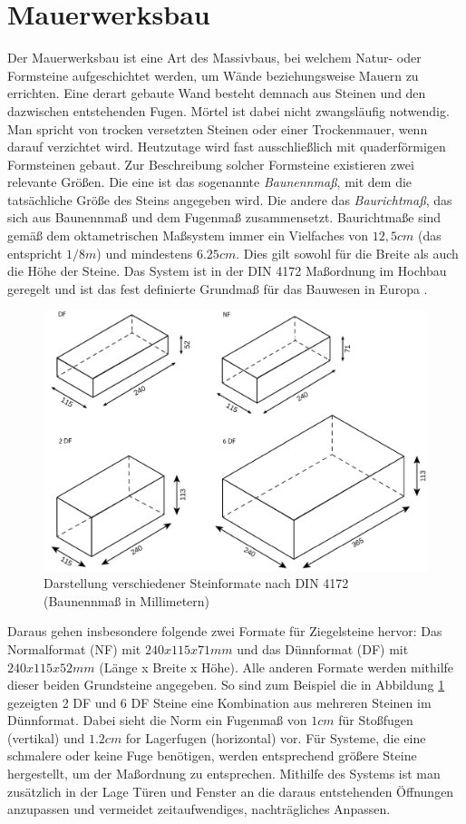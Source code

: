 \section{Mauerwerksbau}
Der Mauerwerksbau ist eine Art des Massivbaus, bei welchem Natur- oder Formsteine aufgeschichtet werden, um Wände beziehungsweise Mauern zu errichten.
Eine derart gebaute Wand besteht demnach aus Steinen und den dazwischen entstehenden Fugen.
Mörtel ist dabei nicht zwangsläufig notwendig.
Man spricht von trocken versetzten Steinen oder einer Trockenmauer, wenn darauf verzichtet wird.
Heutzutage wird fast ausschließlich mit quaderförmigen Formsteinen gebaut.
Zur Beschreibung solcher Formsteine existieren zwei relevante Größen.
Die eine ist das sogenannte \textit{Baunennmaß}, mit dem die tatsächliche Größe des Steins angegeben wird.
Die andere das \textit{Baurichtmaß}, das sich aus Baunennmaß und dem Fugenmaß zusammensetzt.
Baurichtmaße sind gemäß dem oktametrischen Maßsystem immer ein Vielfaches von \(12,5 cm\) (das entspricht \(1/8 m\)) und mindestens \(6.25cm\).
Dies gilt sowohl für die Breite als auch die Höhe der Steine.
Das System ist in der DIN 4172 Maßordnung im Hochbau geregelt und ist das fest definierte Grundmaß für das Bauwesen in Europa \cite{DIN417224} .

\begin{figure}[ht]
    \centering
    \includegraphics[width=0.8\columnwidth]{fig/Ziegelsteinformate DF NF 2DF 6DF.png}
    \caption{Darstellung verschiedener Steinformate nach DIN 4172 (Baunennmaß in Millimetern) \cite{Steinfor38:online}}
    \label{fig:Steinformate}
\end{figure}

Daraus gehen insbesondere folgende zwei Formate für Ziegelsteine hervor:
Das Normalformat (NF) mit \(240 x 115 x 71 mm\) und das Dünnformat (DF) mit  \(240 x 115 x 52 mm\) (Länge x Breite x Höhe).
Alle anderen Formate werden mithilfe dieser beiden Grundsteine angegeben.
So sind zum Beispiel die in Abbildung \ref{fig:Steinformate} gezeigten 2 DF und 6 DF Steine eine Kombination aus mehreren Steinen im Dünnformat.
Dabei sieht die Norm ein Fugenmaß von \(1 cm\) für Stoßfugen (vertikal) und \(1.2 cm\) for Lagerfugen (horizontal) vor.
Für Systeme, die eine schmalere oder keine Fuge benötigen, werden entsprechend größere Steine hergestellt, um der Maßordnung zu entsprechen.
Mithilfe des Systems ist man zusätzlich in der Lage Türen und Fenster an die daraus entstehenden Öffnungen anzupassen und vermeidet zeitaufwendiges, nachträgliches Anpassen.

